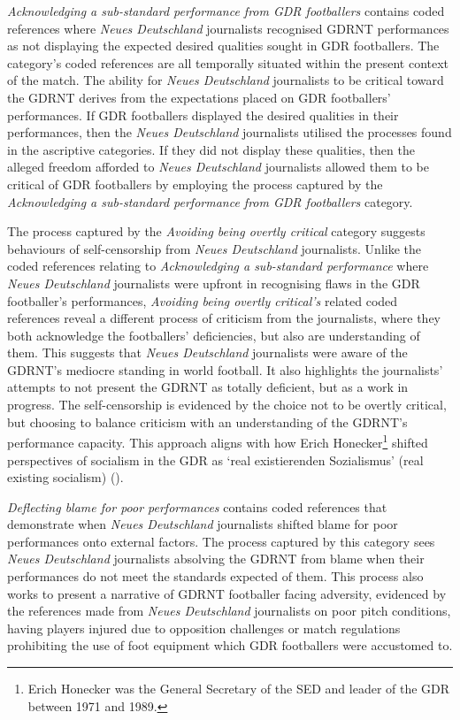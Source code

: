 \textit{Acknowledging a sub-standard performance from GDR footballers} contains coded references where \textit{Neues Deutschland} journalists recognised GDRNT performances as not displaying the expected desired qualities sought in GDR footballers. The category’s coded references are all temporally situated within the present context of the match. The ability for \textit{Neues Deutschland} journalists to be critical toward the GDRNT derives from the expectations placed on GDR footballers’ performances. If GDR footballers displayed the desired qualities in their performances, then the \textit{Neues Deutschland} journalists utilised the processes found in the ascriptive categories. If they did not display these qualities, then the alleged freedom afforded to \textit{Neues Deutschland} journalists allowed them to be critical of GDR footballers by employing the process captured by the \textit{Acknowledging a sub-standard performance from GDR footballers} category.

The process captured by the \textit{Avoiding being overtly critical} category suggests behaviours of self-censorship from \textit{Neues Deutschland} journalists. Unlike the coded references relating to \textit{Acknowledging a sub-standard performance} where \textit{Neues Deutschland} journalists were upfront in recognising flaws in the GDR footballer’s performances, \textit{Avoiding being overtly critical’s} related coded references reveal a different process of criticism from the journalists, where they both acknowledge the footballers’ deficiencies, but also are understanding of them. This suggests that \textit{Neues Deutschland} journalists were aware of the GDRNT’s mediocre standing in world football. It also highlights the journalists’ attempts to not present the GDRNT as totally deficient, but as a work in progress. The self-censorship is evidenced by the choice not to be overtly critical, but choosing to balance criticism with an understanding of the GDRNT’s performance capacity. This approach aligns with how Erich Honecker\footnote{Erich Honecker was the General Secretary of the SED and leader of the GDR between 1971 and 1989.} shifted perspectives of socialism in the GDR as ‘real existierenden Sozialismus’ (real existing socialism) (\cite{borowsky2002}).

\textit{Deflecting blame for poor performances} contains coded references that demonstrate when \textit{Neues Deutschland} journalists shifted blame for poor performances onto external factors. The process captured by this category sees \textit{Neues Deutschland} journalists absolving the GDRNT from blame when their performances do not meet the standards expected of them. This process also works to present a narrative of GDRNT footballer facing adversity, evidenced by the references made from \textit{Neues Deutschland} journalists on poor pitch conditions, having players injured due to opposition challenges or match regulations prohibiting the use of foot equipment which GDR footballers were accustomed to.

